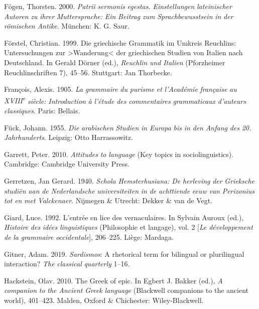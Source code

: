 \documentclass[output=paper]{langsci/langscibook}
\begin{document}
Fögen, Thorsten. 2000. \textit{Patrii} \textit{sermonis} \textit{egestas.} \textit{Einstellungen} \textit{lateinischer} \textit{Autoren} \textit{zu} \textit{ihrer} \textit{Muttersprache:} \textit{Ein} \textit{Beitrag} \textit{zum} \textit{Sprachbewusstsein} \textit{in} \textit{der} \textit{römischen} \textit{Antike}. München: K. G. Saur.

Förstel, Christian. 1999. Die griechische Grammatik im Umkreis Reuchlins: Untersuchungen zur >Wanderung< der griechischen Studien von Italien nach Deutschland. In Gerald Dörner (ed.), \textit{Reuchlin} \textit{und} \textit{Italien} (Pforzheimer Reuchlinschriften 7), 45–56. Stuttgart: Jan Thorbecke.

François, Alexis. 1905. \textit{La} \textit{grammaire} \textit{du} \textit{purisme} \textit{et} \textit{l’Académie} \textit{française} \textit{au} \textit{XVIII\textsuperscript{e}} \textit{siècle:} \textit{Introduction} \textit{à} \textit{l’étude} \textit{des} \textit{commentaires} \textit{grammaticaux} \textit{d’auteurs} \textit{classiques}. Paris: Bellais.

Fück, Johann. 1955. \textit{Die} \textit{arabischen} \textit{Studien} \textit{in} \textit{Europa} \textit{bis} \textit{in} \textit{den} \textit{Anfang} \textit{des} \textit{20.} \textit{Jahrhunderts}. Leipzig: Otto Harrassowitz.

Garrett, Peter. 2010. \textit{Attitudes} \textit{to} \textit{language} (Key topics in sociolinguistics). Cambridge: Cambridge University Press.

Gerretzen, Jan Gerard. 1940. \textit{Schola} \textit{Hemsterhusiana:} \textit{De} \textit{herleving} \textit{der} \textit{Grieksche} \textit{studiën} \textit{aan} \textit{de} \textit{Nederlandsche} \textit{universiteiten} \textit{in} \textit{de} \textit{achttiende} \textit{eeuw} \textit{van} \textit{Perizonius} \textit{tot} \textit{en} \textit{met} \textit{Valckenaer}. Nijmegen \& Utrecht: Dekker \& van de Vegt.

Giard, Luce. 1992. L’entrée en lice des vernaculaires. In Sylvain Auroux (ed.), \textit{Histoire} \textit{des} \textit{idées} \textit{linguistiques} (Philosophie et langage), vol. 2 [\textit{Le} \textit{développement} \textit{de} \textit{la} \textit{grammaire} \textit{occidentale}], 206–225. Liège: Mardaga.

Gitner, Adam. 2019. \textit{Sardismos}: A rhetorical term for bilingual or plurilingual interaction? \textit{The} \textit{classical} \textit{quarterly} 1–16.

Hackstein, Olav. 2010. The Greek of epic. In Egbert J. Bakker (ed.), \textit{A} \textit{companion} \textit{to} \textit{the} \textit{Ancient} \textit{Greek} \textit{language} (Blackwell companions to the ancient world), 401–423. Malden, Oxford \& Chichester: Wiley-Blackwell.
\end{document}
